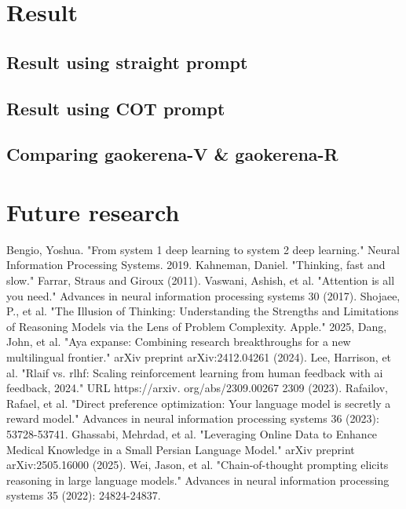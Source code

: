 \documentclass[conference]{IEEEtran}
\begin{document}
            \section{Result}
             \subsection{Result using straight prompt}
            \subsection{Result using COT prompt}
            \subsection{Comparing gaokerena-V \& gaokerena-R }

            \section{Future research}
	
	
	
	\begin{thebibliography}{00}
                Bengio, Yoshua. "From system 1 deep learning to system 2 deep learning." Neural Information Processing Systems. 2019. 
               Kahneman, Daniel. "Thinking, fast and slow." Farrar, Straus and Giroux (2011).
		Vaswani, Ashish, et al. "Attention is all you need." Advances in neural information processing systems 30 (2017).
		Shojaee, P., et al. "The Illusion of Thinking: Understanding the Strengths and Limitations of Reasoning Models via the Lens of Problem Complexity. Apple." 2025,
               Dang, John, et al. "Aya expanse: Combining research breakthroughs for a new multilingual frontier." arXiv preprint arXiv:2412.04261 (2024).
              Lee, Harrison, et al. "Rlaif vs. rlhf: Scaling reinforcement learning from human feedback with ai feedback, 2024." URL https://arxiv. org/abs/2309.00267 2309 (2023).
              Rafailov, Rafael, et al. "Direct preference optimization: Your language model is secretly a reward model." Advances in neural information processing systems 36 (2023): 53728-53741.
             Ghassabi, Mehrdad, et al. "Leveraging Online Data to Enhance Medical Knowledge in a Small Persian Language Model." arXiv preprint arXiv:2505.16000 (2025).
             Wei, Jason, et al. "Chain-of-thought prompting elicits reasoning in large language models." Advances in neural information processing systems 35 (2022): 24824-24837.
         
	\end{thebibliography}
	
	
\end{document}
